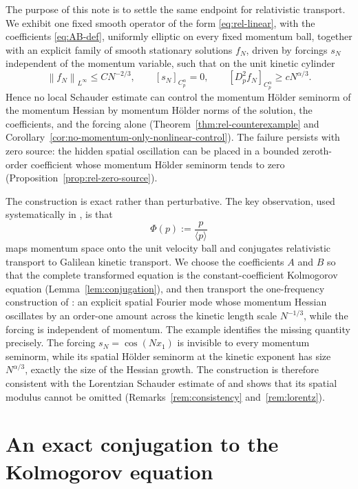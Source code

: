 \documentclass[10pt,a4paper]{amsart}
\numberwithin{equation}{section}
\newcommand{\norm}[1]{\left\|#1\right\|}
\newcommand{\la}[1]{\langle #1\rangle}
\begin{document}
The purpose of this note is to settle the same endpoint for relativistic transport.  We exhibit one fixed smooth operator of the form \eqref{eq:rel-linear}, with the coefficients \eqref{eq:AB-def}, uniformly elliptic on every fixed momentum ball, together with an explicit family of smooth stationary solutions $f_N$, driven by forcings $s_N$ independent of the momentum variable, such that on the unit kinetic cylinder
\[
   \norm{f_N}_{L^\infty}\le CN^{-2/3},
   \qquad
   [s_N]_{C_p^\alpha}=0,
   \qquad
   [D_p^2f_N]_{C_p^\alpha}\ge cN^{\alpha/3}.
\]
Hence no local Schauder estimate can control the momentum H\"older seminorm of the momentum Hessian by momentum H\"older norms of the solution, the coefficients, and the forcing alone (Theorem~\ref{thm:rel-counterexample} and Corollary~\ref{cor:no-momentum-only-nonlinear-control}).  The failure persists with zero source: the hidden spatial oscillation can be placed in a bounded zeroth-order coefficient whose momentum H\"older seminorm tends to zero (Proposition~\ref{prop:rel-zero-source}).

The construction is exact rather than perturbative.  The key observation, used systematically in \cite{HSTT}, is that
\[
   \Phi(p):=\frac{p}{\la p}
\]
maps momentum space onto the unit velocity ball and conjugates relativistic transport to Galilean kinetic transport.  We choose the coefficients $A$ and $B$ so that the complete transformed equation is the constant-coefficient Kolmogorov equation (Lemma~\ref{lem:conjugation}), and then transport the one-frequency construction of \cite{DW26}: an explicit spatial Fourier mode whose momentum Hessian oscillates by an order-one amount across the kinetic length scale $N^{-1/3}$, while the forcing is independent of momentum. The example identifies the missing quantity precisely.  The forcing $s_N=\cos(Nx_1)$ is invisible to every momentum seminorm, while its spatial H\"older seminorm at the kinetic exponent has size $N^{\alpha/3}$, exactly the size of the Hessian growth.  The construction is therefore consistent with the Lorentzian Schauder estimate of \cite{HSTT} and shows that its spatial modulus cannot be omitted (Remarks~\ref{rem:consistency} and~\ref{rem:lorentz}).
\section{An exact conjugation to the Kolmogorov equation}\label{sec:conjugation}
\end{document}
